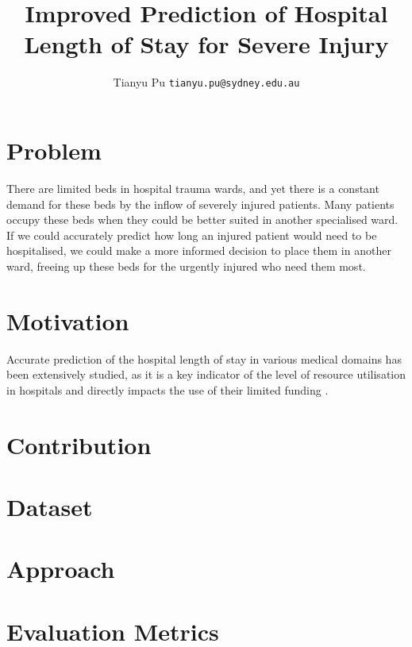 \documentclass[portrait]{usydposter}
\title{Improved Prediction of Hospital Length of Stay for Severe Injury}
\author{Tianyu Pu \xspace \texttt{tianyu.pu@sydney.edu.au}}
\begin{document}
\makeheader

\begin{multicols}{3}

\section{Problem}
\noindent There are limited beds in hospital trauma wards, and yet there is a
constant demand for these beds by the inflow of severely injured patients. Many
patients occupy these beds when they could be better suited in another
specialised ward. If we could accurately predict how long an injured patient
would need to be hospitalised, we could make a more informed decision to place
them in another ward, freeing up these beds for the urgently injured who need
them most.

\section{Motivation}
\noindent Accurate prediction of the hospital length of stay in various medical
domains has been extensively studied, as it is a key indicator of the level of
resource utilisation in hospitals and directly impacts the use of their limited
funding \cite{Walczak2003}.

\section{Contribution}
\noindent

\section{Dataset}

\section{Approach}

\section{Evaluation Metrics}


\end{multicols}
\end{document}
